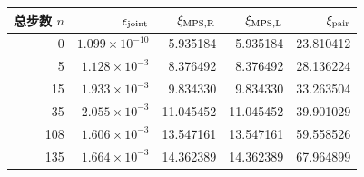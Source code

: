 \begin{tabular}{rrrrr}
\toprule
总步数 $n$ & $\epsilon_{\rm joint}$ & $\xi_{\rm MPS,R}$ & $\xi_{\rm MPS,L}$ & $\xi_{\rm pair}$ \\
\midrule
0 & $1.099\times10^{-10}$ & 5.935184 & 5.935184 & 23.810412 \\
5 & $1.128\times10^{-3}$ & 8.376492 & 8.376492 & 28.136224 \\
15 & $1.933\times10^{-3}$ & 9.834330 & 9.834330 & 33.263504 \\
35 & $2.055\times10^{-3}$ & 11.045452 & 11.045452 & 39.901029 \\
108 & $1.606\times10^{-3}$ & 13.547161 & 13.547161 & 59.558526 \\
135 & $1.664\times10^{-3}$ & 14.362389 & 14.362389 & 67.964899 \\
\bottomrule
\end{tabular}
